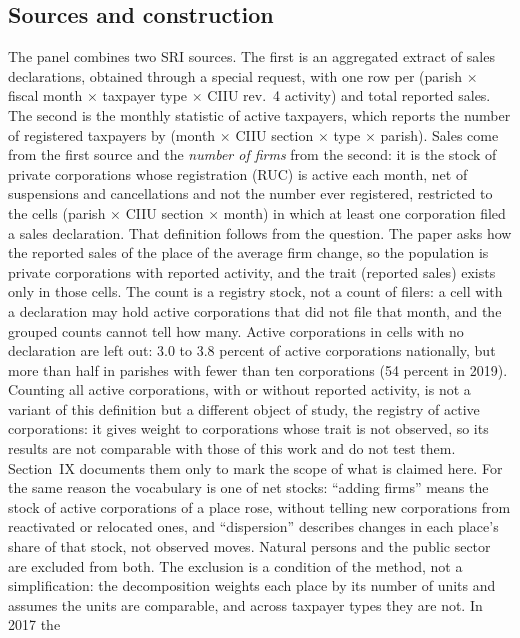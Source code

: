 \documentclass[conference]{IEEEtran}
\begin{document}
\subsection{Sources and construction}

The panel combines two SRI sources. The first is an aggregated extract of
sales declarations, obtained through a special request, with one row per
(parish $\times$ fiscal month $\times$ taxpayer type $\times$ CIIU rev.~4
activity) and total reported sales. The second is the monthly statistic of
active taxpayers, which reports the number of registered taxpayers by
(month $\times$ CIIU section $\times$ type $\times$ parish). Sales come
from the first source and the \textit{number of firms} from the second:
it is the stock of private corporations whose registration (RUC) is
active each month, net of suspensions and cancellations and not the
number ever registered, restricted to the cells (parish $\times$ CIIU section $\times$
month) in which at least one corporation filed a sales declaration.
That definition follows from the question. The paper asks how the
reported sales of the place of the average firm change, so the population
is private corporations with reported activity, and the trait (reported
sales) exists only in those cells. The count is a registry stock, not a
count of filers: a cell with a declaration may hold active corporations
that did not file that month, and the grouped counts cannot tell how
many. Active corporations in cells with no declaration are left out:
3.0 to 3.8 percent of active corporations nationally, but more than half in
parishes with fewer than ten corporations (54 percent in 2019). Counting all active corporations, with or without reported activity, is
not a variant of this definition but a different object of study, the
registry of active corporations: it gives weight to corporations whose
trait is not observed, so its results are not comparable with those of
this work and do not test them. Section~IX documents them only to mark the
scope of what is claimed here. For the same reason the vocabulary is one of net stocks:
``adding firms'' means the stock of active corporations of a place rose,
without telling new corporations from reactivated or relocated ones, and
``dispersion'' describes changes in each place's share of that stock, not
observed moves.
Natural persons and the public sector are excluded from both. The
exclusion is a condition of the method, not a simplification: the
decomposition weights each place by its number of units and assumes the
units are comparable, and across taxpayer types they are not. In 2017 the
\end{document}

